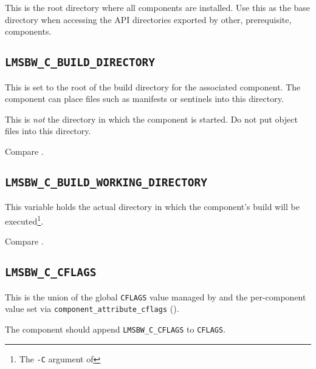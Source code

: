 This is the root directory where all components are installed.  Use
this as the base directory when accessing the API directories exported
by other, prerequisite, components.

\subsection{\texttt{LMSBW\_C\_BUILD\_DIRECTORY}}\label{wrap:lmsbw-c-build-directory}

This is set to the root of the build directory for the associated
component.  The component \makefile can place files such as \mtree
manifests or \make sentinels into this directory.

This is \emph{not} the directory in which the component \makefile is
started.   Do not put object files into this directory.

Compare .

\subsection{\texttt{LMSBW\_C\_BUILD\_WORKING\_DIRECTORY}}\label{wrap:lmsbw-c-build-working-directory}

This variable holds the actual directory in which the component's
build will be executed\footnote{The \texttt{-C} argument of \make}.

Compare .

\subsection{\texttt{LMSBW\_C\_CFLAGS}}

This is the union of the global \texttt{CFLAGS} value managed by
\lmsbw and the per-component value set via
\texttt{\texttt{component\_attribute\_cflags}} ().

The component \makefile should append \texttt{LMSBW\_C\_CFLAGS} to
\texttt{CFLAGS}.

